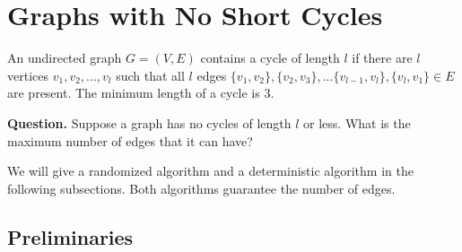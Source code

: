 \section{Graphs with No Short Cycles}
\begin{definition}
An undirected graph $G = (V,E)$ contains a cycle of length $l$ if there are $l$ vertices $v_1,v_2,...,v_l$ such that all $l$ edges $\{v_1,v_2\},\{v_2,v_3\},...\{v_{l−1},v_l\},\{v_l,v_1\} \in E$ are present. The minimum length of a cycle is $3$.
\end{definition}
\noindent\textbf{Question.} Suppose a graph has no cycles of length $l$ or less. What is the maximum number of edges that it can have?

We will give a randomized algorithm and a deterministic algorithm in the following subsections. Both algorithms guarantee the number of edges.
\subsection{Preliminaries}

